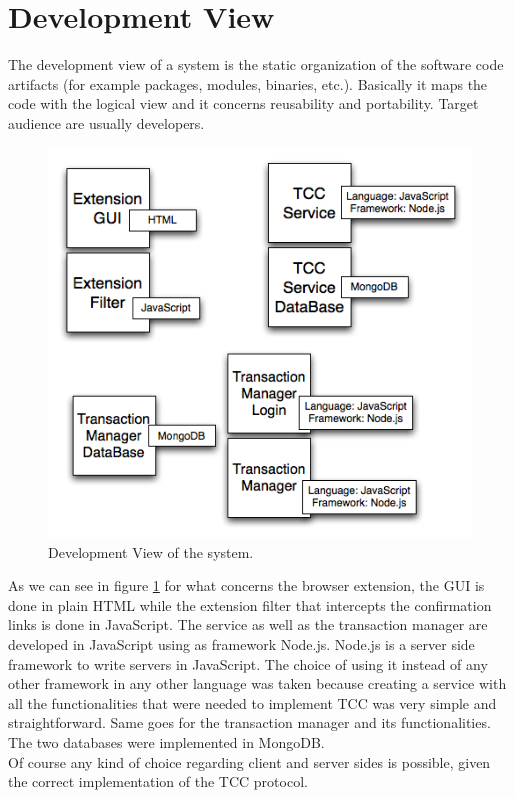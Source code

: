 \section{Development View}
The development view of a system is the static organization of the software code artifacts (for example packages, modules, binaries, etc.). Basically it maps the code with the logical view and it concerns reusability and portability. Target audience are usually developers.\\

\begin{figure} [ht]
\centering
\includegraphics[scale=0.65]{images/development_view.jpg}
\caption{Development View of the system.}
\label{tcc-development-view}
\end{figure}

As we can see in figure \ref{tcc-development-view} for what concerns the browser extension, the GUI is done in plain HTML while the extension filter that intercepts the confirmation links is done in JavaScript. The service as well as the transaction manager are developed in JavaScript using as framework Node.js. Node.js is a server side framework to write servers in JavaScript. The choice of using it instead of any other framework in any other language was taken because creating a service with all the functionalities that were needed to implement TCC was very simple and straightforward. Same goes for the transaction manager and its functionalities. The two databases were implemented in MongoDB.\\
Of course any kind of choice regarding client and server sides is possible, given the correct implementation of the TCC protocol.

